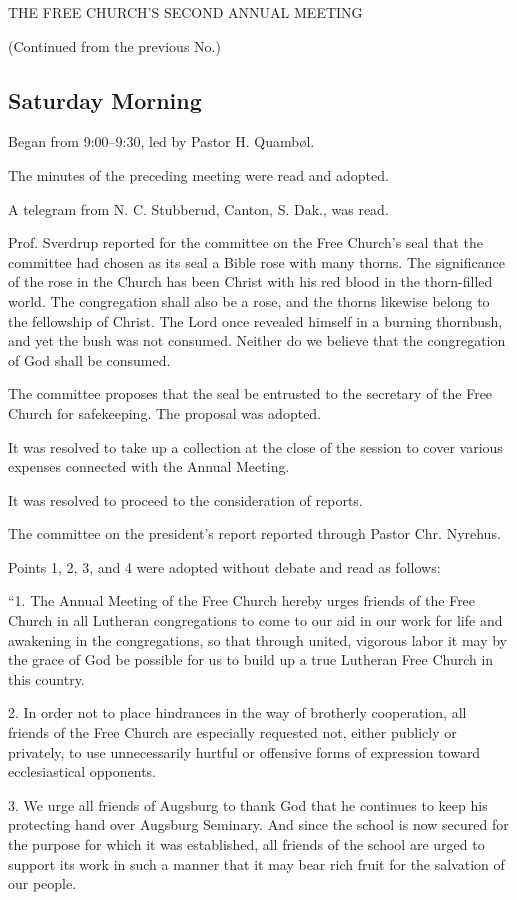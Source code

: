 
THE FREE CHURCH’S SECOND ANNUAL MEETING

(Continued from the previous No.)

\subsection{Saturday Morning}

Began from 9:00–9:30, led by Pastor H. Quambøl.

The minutes of the preceding meeting were read and adopted.

A telegram from N. C. Stubberud, Canton, S. Dak., was read.

Prof. Sverdrup reported for the committee on the Free Church’s seal that the committee had chosen as its seal a Bible rose with many thorns. The significance of the rose in the Church has been Christ with his red blood in the thorn-filled world. The congregation shall also be a rose, and the thorns likewise belong to the fellowship of Christ. The Lord once revealed himself in a burning thornbush, and yet the bush was not consumed. Neither do we believe that the congregation of God shall be consumed.

The committee proposes that the seal be entrusted to the secretary of the Free Church for safekeeping. The proposal was adopted.

It was resolved to take up a collection at the close of the session to cover various expenses connected with the Annual Meeting.

It was resolved to proceed to the consideration of reports.

The committee on the president’s report reported through Pastor Chr. Nyrehus.

Points 1, 2, 3, and 4 were adopted without debate and read as follows:

“1. The Annual Meeting of the Free Church hereby urges friends of the Free Church in all Lutheran congregations to come to our aid in our work for life and awakening in the congregations, so that through united, vigorous labor it may by the grace of God be possible for us to build up a true Lutheran Free Church in this country.

2. In order not to place hindrances in the way of brotherly cooperation, all friends of the Free Church are especially requested not, either publicly or privately, to use unnecessarily hurtful or offensive forms of expression toward ecclesiastical opponents.

3. We urge all friends of Augsburg to thank God that he continues to keep his protecting hand over Augsburg Seminary. And since the school is now secured for the purpose for which it was established, all friends of the school are urged to support its work in such a manner that it may bear rich fruit for the salvation of our people.

